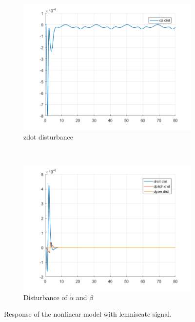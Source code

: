 \documentclass[11pt]{article}
\begin{document}
\begin{enumerate}
\begin{figure}[ht]
        \begin{subfigure}[c]{0.3\linewidth}
            \centering
            \includegraphics[width=\linewidth]{Plots_13_NonlinearModel_Lemniscate/10}
            \caption{zdot disturbance}
        \end{subfigure}
        ~
        \begin{subfigure}[c]{0.3\linewidth}
            \centering
            \includegraphics[width=\linewidth]{Plots_13_NonlinearModel_Lemniscate/11}
            \caption{Disturbance of $\dot{\alpha}$ and $\dot{\beta}$}
        \end{subfigure}
        
        \caption{Response of the nonlinear model with lemniscate signal.}
        \label{fig:nonlinear_model_lemniscate_signal}
\end{figure}
\end{enumerate}
\end{document}
